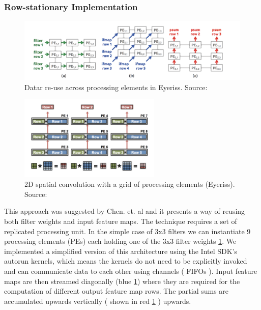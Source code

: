\subsubsection{Row-stationary Implementation}

\begin{figure}[h]
\centering
\includegraphics[width=1.0\textwidth]{Figures/eyeriss}
\decoRule
\caption[Eyeriss]{ Datar re-use across processing elements in Eyeriss. Source: \cite{eyeriss}}
\label{fig:eyeriss}
\end{figure}

\begin{figure}[h]
\centering
\includegraphics[width=0.6\textwidth]{Figures/eyeriss2}
\decoRule
\caption[Eyeriss2]{ 2D spatial convolution with a grid of processing elements (Eyeriss). Source: \cite{sze2017efficient}}
\label{fig:eyeriss2}
\end{figure}

This approach was suggested by Chen. et. al \cite{eyeriss} and it presents a way of reusing both filter weights and input feature maps. The technique requires a set of replicated processing unit. In the simple case of 3x3 filters we can instantiate 9 processing elements (PEs) each holding one of the 3x3 filter weights \ref{fig:eyeriss}. We implemented a simplified version of this architecture using the Intel SDK’s autorun kernels, which means the kernels do not need to be explicitly invoked and can communicate data to each other using channels ( FIFOs ). Input feature maps are then streamed diagonally (blue \ref{fig:eyeriss}) where they are required for the computation of different output feature map rows. The partial sums are accumulated upwards vertically ( shown in red \ref{fig:eyeriss} ) upwards. 

